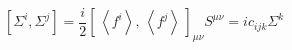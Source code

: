 \begin{equation}\label{SSffS}
\left[\Sigma^i, \Sigma^j\right]=
\textstyle{\frac{i}{2} \left[\,\left<f^i\right>,\,\left<f^j\right>\,
\right]_{\mu\nu}} S^{\mu\nu}= ic_{ijk}\Sigma^k 
\end{equation}

